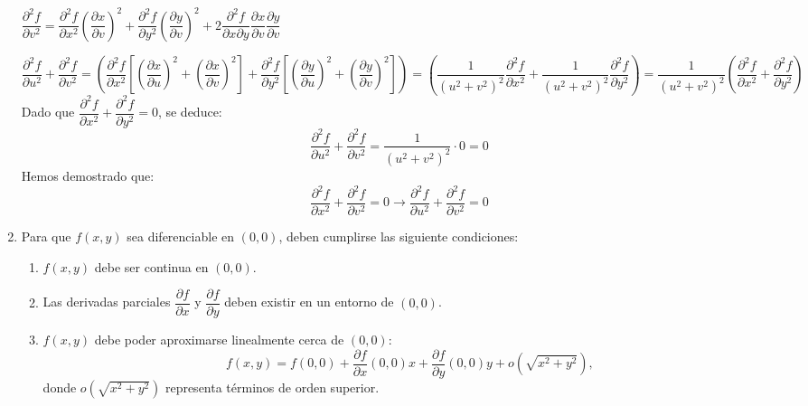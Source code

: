 \begin{enumerate}[label=\color{red}\textbf{\arabic*)}, leftmargin=*]
$\dfrac{ \partial^{2} f }{ \partial v^{2} }=\dfrac{ \partial^{2} f }{ \partial x^{2} }\left( \dfrac{ \partial x }{ \partial v } \right)^{2}+\dfrac{ \partial^{2} f }{ \partial y^{2} }\left( \dfrac{ \partial y }{ \partial v } \right)^{2}+2\dfrac{ \partial^{2} f }{ \partial x\partial y }\dfrac{ \partial x }{ \partial v }\dfrac{ \partial y }{ \partial v }$

$\dfrac{ \partial^{2} f }{ \partial u^{2} }+\dfrac{ \partial^{2} f }{ \partial v^{2} }=\left( \dfrac{ \partial^{2} f }{ \partial x^{2} }\left[ \left( \dfrac{ \partial x }{ \partial u } \right)^{2}+\left( \dfrac{ \partial x }{ \partial v } \right)^{2} \right]+\dfrac{ \partial^{2} f }{ \partial y^{2} }\left[ \left( \dfrac{ \partial y }{ \partial u } \right)^{2}+\left( \dfrac{ \partial y }{ \partial v } \right)^{2} \right] \right)=\left( \dfrac{1}{(u^{2}+v^{2})^{2}}\dfrac{ \partial^{2} f }{ \partial x^{2} }+\dfrac{1}{(u^{2}+v^{2})^{2}}\dfrac{ \partial^{2} f }{ \partial y^{2} } \right)=\dfrac{1}{(u^{2}+v^{2})^{2}}\left( \dfrac{ \partial^{2} f }{ \partial x^{2} }+\dfrac{ \partial^{2} f }{ \partial y^{2} } \right)$
Dado que $\dfrac{ \partial^{2} f }{ \partial x^{2} }+\dfrac{ \partial^{2} f }{ \partial y^{2} }=0$, se deduce:
$$
\dfrac{ \partial^{2} f }{ \partial u^{2} } +\dfrac{ \partial^{2} f }{ \partial v^{2} } =\dfrac{1}{(u^{2}+v^{2})^{2}}\cdot0=0
$$
Hemos demostrado que:
$$
\dfrac{ \partial^{2} f }{ \partial x^{2} } +\dfrac{ \partial^{2} f }{ \partial v^{2} } =0\longrightarrow \dfrac{ \partial^{2} f }{ \partial u^{2} } +\dfrac{ \partial^{2} f }{ \partial v^{2} } =0
$$


\item {}

Para que $f(x,y)$ sea diferenciable en $(0,0)$, deben cumplirse las siguiente condiciones:

\begin{enumerate}[label=\arabic*)]
\item $f(x,y)$ debe ser continua en $(0,0)$.
\item Las derivadas parciales $\dfrac{\partial f}{\partial x}$ y $\dfrac{\partial f}{\partial y}$ deben existir en un entorno de $(0,0)$.
\item $f(x,y)$ debe poder aproximarse linealmente cerca de $(0,0)$:
$$
f(x,y)=f(0,0)+\dfrac{\partial f}{\partial x}(0,0)x+\dfrac{\partial f}{\partial y}(0,0)y+o\left(\sqrt{x^2+y^2}\right),
$$
donde $o\left(\sqrt{x^2+y^2}\right)$ representa términos de orden superior.
\end{enumerate}


\end{enumerate}

